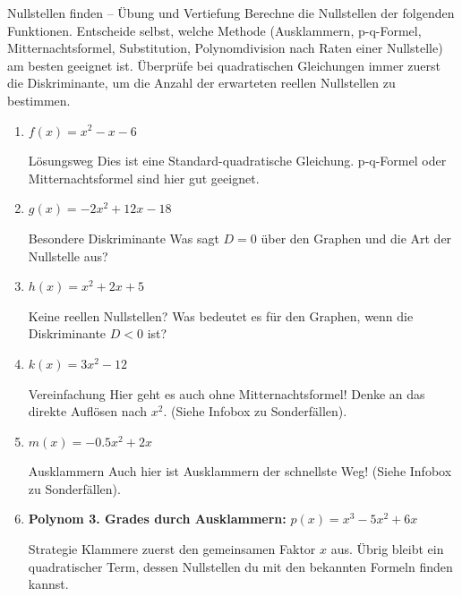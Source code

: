 \begin{aufgabenumgebung}{Nullstellen finden – Übung und Vertiefung}
Berechne die Nullstellen der folgenden Funktionen. Entscheide selbst, welche Methode (Ausklammern, p-q-Formel, Mitternachtsformel, Substitution, Polynomdivision nach Raten einer Nullstelle) am besten geeignet ist. Überprüfe bei quadratischen Gleichungen immer zuerst die Diskriminante, um die Anzahl der erwarteten reellen Nullstellen zu bestimmen.
\begin{enumerate}
    \item $f(x) = x^2 - x - 6$
        \begin{tippumgebung}{Lösungsweg}
        Dies ist eine Standard-quadratische Gleichung. p-q-Formel oder Mitternachtsformel sind hier gut geeignet.
        \end{tippumgebung}

    \item $g(x) = -2x^2 + 12x - 18$ 
        \begin{tippumgebung}{Besondere Diskriminante}
        Was sagt $D=0$ über den Graphen und die Art der Nullstelle aus?
        \end{tippumgebung}

    \item $h(x) = x^2 + 2x + 5$
        \begin{tippumgebung}{Keine reellen Nullstellen?}
        Was bedeutet es für den Graphen, wenn die Diskriminante $D<0$ ist?
        \end{tippumgebung}

    \item $k(x) = 3x^2 - 12$ 
        \begin{tippumgebung}{Vereinfachung}
        Hier geht es auch ohne Mitternachtsformel! Denke an das direkte Auflösen nach $x^2$. (Siehe Infobox zu Sonderfällen).
        \end{tippumgebung}

    \item $m(x) = -0.5x^2 + 2x$
        \begin{tippumgebung}{Ausklammern}
        Auch hier ist Ausklammern der schnellste Weg! (Siehe Infobox zu Sonderfällen).
        \end{tippumgebung}

    \item \textbf{Polynom 3. Grades durch Ausklammern:}
        $p(x) = x^3 - 5x^2 + 6x$
        \begin{tippumgebung}{Strategie}
        Klammere zuerst den gemeinsamen Faktor $x$ aus. Übrig bleibt ein quadratischer Term, dessen Nullstellen du mit den bekannten Formeln finden kannst.
        \end{tippumgebung}


\end{enumerate}
\end{aufgabenumgebung}
